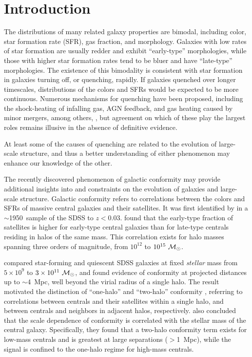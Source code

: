
\section{Introduction}\label{sec:intro}

The distributions of many related galaxy properties are bimodal, including color, star formation rate (SFR), gas fraction, and morphology.
Galaxies with low rates of star formation are usually redder and exhibit ``early-type'' morphologies, while those with higher star formation rates tend to be bluer and have ``late-type'' morphologies.
The existence of this bimodality is consistent with star formation in galaxies turning off, or quenching, rapidly.
If galaxies quenched over longer timescales, distributions of the colors and SFRs would be expected to be more continuous.
Numerous mechanisms for quenching have been proposed, including the shock-heating of infalling gas, AGN feedback, and gas heating caused by minor mergers, among others, , but agreement on which of these play the largest roles remains illusive in the absence of definitive evidence.

At least some of the causes of quenching are related to the evolution of large-scale structure, and thus a better understanding of either phenomenon may enhance our knowledge of the other.

The recently discovered phenomenon of galactic conformity may provide additional insights into and constraints on the evolution of galaxies and large-scale structure.
Galactic conformity refers to correlations between the colors and SFRs of massive central galaxies and their satellites.
It was first identified by \citet{Weinmann06} in a $\sim$1950~\degsq sample of the SDSS to $z<0.03$.
\citet{Weinmann06} found that the early-type fraction of satellites is higher for early-type central galaxies than for late-type centrals residing in halos of the same mass.
This correlation exists for halo masses spanning three orders of magnitude, from $10^{12}$ to $10^{15}~\msun$.

\citet{Kauffmann13} compared star-forming and quiescent SDSS galaxies at fixed \emph{stellar} mass from $5\times10^9$ to $3\times10^{11}~\msun$, and found evidence of conformity at projected distances up to $\sim$4~Mpc, well beyond the virial radius of a single halo.
The \citet{Kauffmann13} result motivated the distinction of ``one-halo'' and ``two-halo'' conformity \citep{Hearin15a}, referring to correlations between centrals and their satellites within a single halo, and between centrals and neighbors in adjacent halos, respectively.
\citet{Kauffmann13} also concluded that the scale dependence of conformity is correlated with the stellar mass of the central galaxy.
Specifically, they found that a two-halo conformity term exists for low-mass centrals and is greatest at large separations ($>$1~Mpc), while the signal is confined to the one-halo regime for high-mass centrals.

